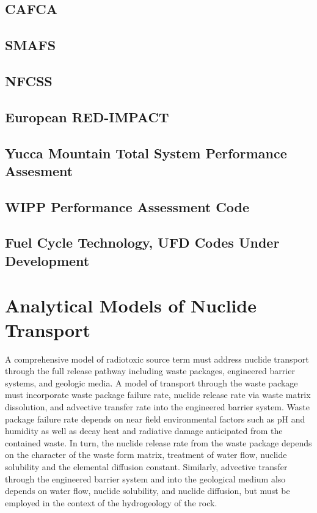 \subsection{CAFCA}

\subsection{SMAFS}

\subsection{NFCSS}

\subsection{European RED-IMPACT}

\subsection{Yucca Mountain Total System Performance Assesment}

\subsection{WIPP Performance Assessment Code}

\subsection{Fuel Cycle Technology, UFD Codes Under Development}


\section{Analytical Models of Nuclide Transport} 
\label{sec:analytical_nuc}


A comprehensive model of radiotoxic source term must address nuclide 
transport through the full release pathway including waste packages, 
engineered barrier systems, and geologic media. A model of transport 
through the waste package must incorporate waste package failure rate, 
nuclide release rate via waste matrix dissolution, and advective 
transfer rate into the engineered barrier system.  Waste package 
failure rate depends on near field environmental factors such as pH 
and humidity as well as decay heat and radiative damage anticipated 
from the contained waste.  In turn, the nuclide release rate from the 
waste package depends on the character of the waste form matrix, 
treatment of water flow, nuclide solubility and the elemental 
diffusion constant.  Similarly, advective transfer through the 
engineered barrier system and into the geological medium also depends 
on water flow, nuclide solubility, and nuclide diffusion, but must be 
employed in the context of the hydrogeology of the rock.   

